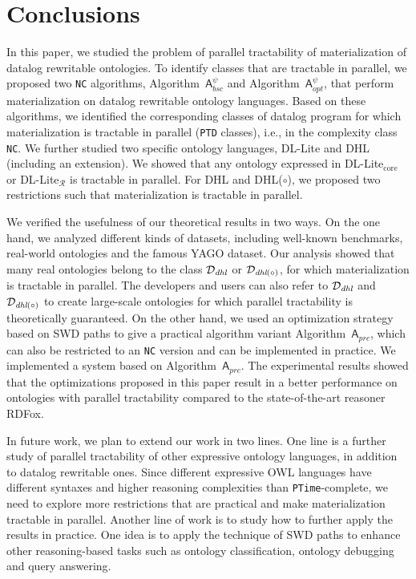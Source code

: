 \section{Conclusions}
\label{sec:conclusion}

In this paper, we studied the problem of parallel tractability of
materialization of datalog rewritable ontologies.
To identify classes that are tractable in parallel,
we proposed two \texttt{NC} algorithms, Algorithm~$\mathsf{A}_{bsc}^\psi$
and Algorithm~$\mathsf{A}_{opt}^\psi$, that perform materialization on
datalog rewritable ontology languages.
Based on these algorithms, we identified the corresponding classes of
datalog program for which materialization is tractable in
parallel (\texttt{PTD} classes), i.e., in the complexity class \texttt{NC}.
We further studied two specific ontology languages, DL-Lite and DHL (including an extension).
We showed that any ontology expressed in DL-Lite$_{\text{core}}$ or
DL-Lite$_{\mathcal{R}}$ is tractable in parallel.
For DHL and DHL($\circ$), we proposed two restrictions such that
materialization is tractable in parallel.

We verified the usefulness of our theoretical results in two ways. On the one hand,
we analyzed different kinds of datasets,
including well-known benchmarks, real-world ontologies and the famous YAGO dataset.
Our analysis showed that many real ontologies belong to
the class $\mathcal{D}_{\textit{\text{dhl}}}$ or $\mathcal{D}_{\textit{\text{dhl}}(\circ)}$, for which
materialization is tractable in parallel. The
developers and users can also refer to $\mathcal{D}_{\textit{\text{dhl}}}$
and $\mathcal{D}_{\textit{\text{dhl}}(\circ)}$
to create large-scale ontologies for which parallel tractability
is theoretically guaranteed. On the other hand,
we used an optimization strategy based on SWD paths
to give a practical algorithm variant Algorithm~$\mathsf{A}_{prc}$, which can
also be restricted to an \texttt{NC} version and can be implemented in practice.
We implemented a system based on Algorithm~$\mathsf{A}_{prc}$.
The experimental results showed that the optimizations proposed in this paper result
in a better performance on ontologies with parallel tractability compared
to the state-of-the-art reasoner RDFox.

In future work, we plan to extend our work in two lines.
One line is a further study of parallel tractability of
other expressive ontology languages, in addition to
datalog rewritable ones. Since different expressive OWL languages
have different syntaxes and higher reasoning complexities than \texttt{PTime}-complete, we need to
explore more restrictions that are practical and make materialization
tractable in parallel. Another line of work is to
study how to further apply the
results in practice.
One idea is to apply the technique of SWD paths to enhance other
reasoning-based tasks such as ontology classification, ontology debugging and query answering.




